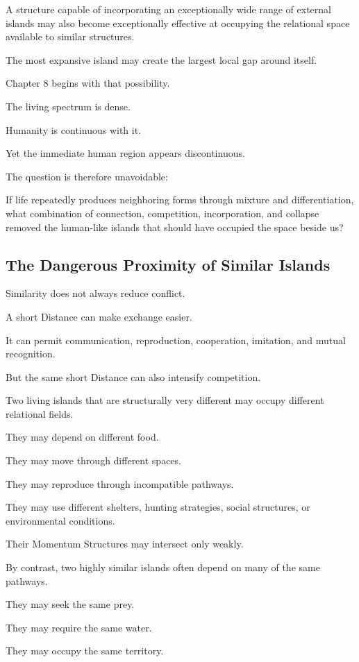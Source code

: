 A structure capable of incorporating an exceptionally wide range of external islands may also become exceptionally effective at occupying the relational space available to similar structures.

The most expansive island may create the largest local gap around itself.

Chapter 8 begins with that possibility.

The living spectrum is dense.

Humanity is continuous with it.

Yet the immediate human region appears discontinuous.

The question is therefore unavoidable:

If life repeatedly produces neighboring forms through mixture and differentiation, what combination of connection, competition, incorporation, and collapse removed the human-like islands that should have occupied the space beside us?

\subsection*{\textbf{The Dangerous Proximity of Similar Islands}}

Similarity does not always reduce conflict.

A short Distance can make exchange easier.

It can permit communication, reproduction, cooperation, imitation, and mutual recognition.

But the same short Distance can also intensify competition.

Two living islands that are structurally very different may occupy different relational fields.

They may depend on different food.

They may move through different spaces.

They may reproduce through incompatible pathways.

They may use different shelters, hunting strategies, social structures, or environmental conditions.

Their Momentum Structures may intersect only weakly.

By contrast, two highly similar islands often depend on many of the same pathways.

They may seek the same prey.

They may require the same water.

They may occupy the same territory.

